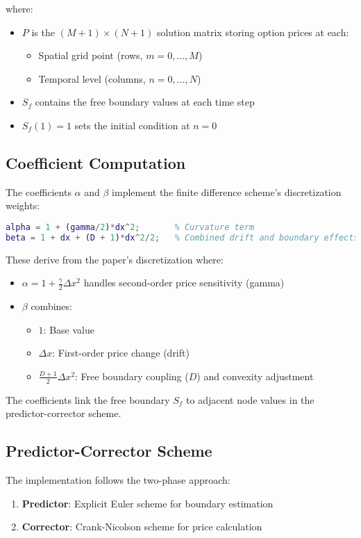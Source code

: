 \documentclass{article}
\begin{document}
where:
\begin{itemize}
    \item $P$ is the $(M+1)\times(N+1)$ solution matrix storing option prices at each:
    \begin{itemize}
        \item Spatial grid point (rows, $m = 0,...,M$)
        \item Temporal level (columns, $n = 0,...,N$)
    \end{itemize}
    \item $S_f$ contains the free boundary values at each time step
    \item $S_f(1)=1$ sets the initial condition at $n=0$
\end{itemize}
\subsection{Coefficient Computation}
The coefficients $\alpha$ and $\beta$ implement the finite difference scheme's discretization weights:

\begin{lstlisting}[language=Matlab]
alpha = 1 + (gamma/2)*dx^2;       % Curvature term
beta = 1 + dx + (D + 1)*dx^2/2;   % Combined drift and boundary effects
\end{lstlisting}

These derive from the paper's discretization where:
\begin{itemize}
\item $\alpha = 1 + \frac{\gamma}{2}\Delta x^2$ handles second-order price sensitivity (gamma)
\item $\beta$ combines:
  \begin{itemize}
  \item $1$: Base value
  \item $\Delta x$: First-order price change (drift)
  \item $\frac{D+1}{2}\Delta x^2$: Free boundary coupling ($D$) and convexity adjustment
  \end{itemize}
\end{itemize}
The coefficients link the free boundary $S_f$ to adjacent node values in the predictor-corrector scheme.
\subsection{Predictor-Corrector Scheme}
The implementation follows the two-phase approach:

\begin{enumerate}
    \item \textbf{Predictor}: Explicit Euler scheme for boundary estimation
    \item \textbf{Corrector}: Crank-Nicolson scheme for price calculation
\end{enumerate}
\end{document}
